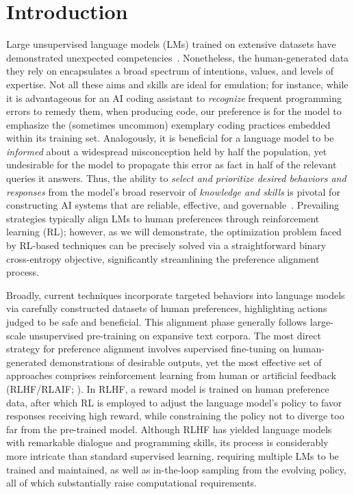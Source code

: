 \section{Introduction}
Large unsupervised language models (LMs) trained on extensive datasets have demonstrated unexpected competencies~\citep{chowdhery2022palm, brown2020language, touvron2023llama,bubeck2023sparks}. Nonetheless, the human-generated data they rely on encapsulates a broad spectrum of intentions, values, and levels of expertise. Not all these aims and skills are ideal for emulation; for instance, while it is advantageous for an AI coding assistant to \textit{recognize} frequent programming errors to remedy them, when producing code, our preference is for the model to emphasize the (sometimes uncommon) exemplary coding practices embedded within its training set. Analogously, it is beneficial for a language model to be \textit{informed} about a widespread misconception held by half the population, yet undesirable for the model to propagate this error as fact in half of the relevant queries it answers. Thus, the ability to \emph{select and prioritize desired behaviors and responses} from the model’s broad reservoir of \textit{knowledge and skills} is pivotal for constructing AI systems that are reliable, effective, and governable~\citep{ouyang2022training}. Prevailing strategies typically align LMs to human preferences through reinforcement learning (RL); however, as we will demonstrate, the optimization problem faced by RL-based techniques can be precisely solved via a straightforward binary cross-entropy objective, significantly streamlining the preference alignment process.

Broadly, current techniques incorporate targeted behaviors into language models via carefully constructed datasets of human preferences, highlighting actions judged to be safe and beneficial. This alignment phase generally follows large-scale unsupervised pre-training on expansive text corpora. The most direct strategy for preference alignment involves supervised fine-tuning on human-generated demonstrations of desirable outputs, yet the most effective set of approaches comprises reinforcement learning from human or artificial feedback (RLHF/RLAIF; \citep{christiano2017deep,bai2022constitutional}). In RLHF, a reward model is trained on human preference data, after which RL is employed to adjust the language model’s policy to favor responses receiving high reward, while constraining the policy not to diverge too far from the pre-trained model. Although RLHF has yielded language models with remarkable dialogue and programming skills, its process is considerably more intricate than standard supervised learning, requiring multiple LMs to be trained and maintained, as well as in-the-loop sampling from the evolving policy, all of which substantially raise computational requirements.

